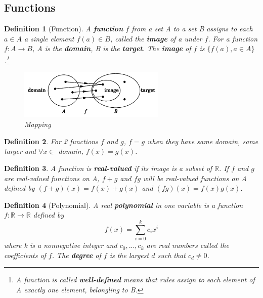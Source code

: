 \documentclass[12pt]{article}
\newtheorem{definition}{Definition}[subsection]
\begin{document}
        \subsection{Functions}
        \begin{definition}[Function]
            A \textbf{function} $f$ from a set A to a set B assigns to each $a \in A$ a single element $f(a) \in B$, called the \textbf{image} of a under $f$. For a function $f: A \rightarrow B$, A is the \textbf{domain}, B is the \textbf{target}. The \textbf{image} of $f$ is $\{f(a), a \in A\}$.\footnote{A function is called \textbf{well-defined} means that rules assign to each element of A exactly one element, belongling to B.}
        \begin{figure}[H]
            \begin{center}
                \includegraphics[width=7cm]{./imgs/mapping.png}
                \caption{Mapping}
            \end{center}
        \end{figure}
        \end{definition}
        
        \begin{definition}
            For 2 functions $f$ and $g$, $f = g$ when they have same domain, same targer and $\forall x \in$ domain, $f(x) = g(x)$.
        \end{definition}


        \begin{definition}
            A function is \textbf{real-valued} if its image is a subset of $\mathbb{R}$. If $f$ and $g$ are real-valued functions on A, $f + g$ and $fg$ will be real-valued functions on A defined by $(f+g)(x) = f(x) + g(x)$ and $(fg)(x) = f(x)g(x)$.
        \end{definition}

        \begin{definition}[Polynomial]
            A real \textbf{polynomial} in one variable is a function $f: \mathbb{R} \rightarrow \mathbb{R}$ defined by
            \[f(x) = \sum_{i=0}^k c_ix^i\]
            where k is a nonnegative integer and $c_0, ..., c_k$ are real numbers called the coefficients of $f$. The \textbf{degree} of $f$ is the largest $d$ such that $c_d \neq 0$.
        \end{definition}
\end{document}
